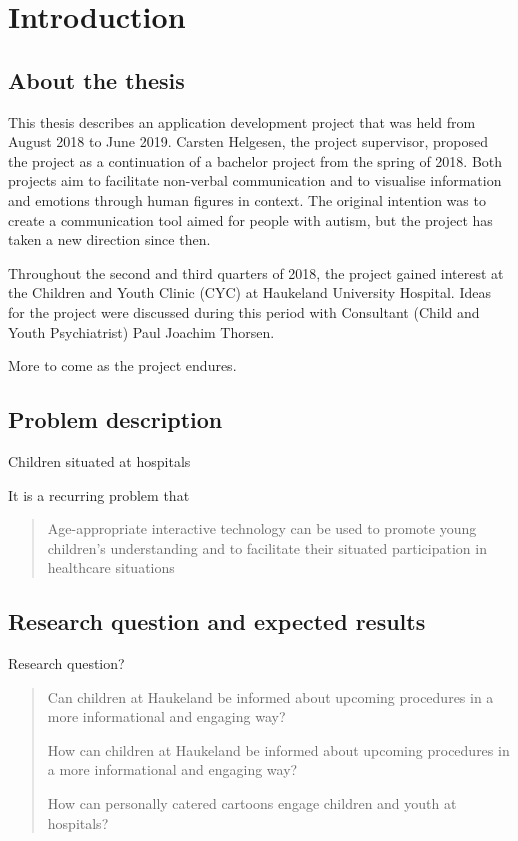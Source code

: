 \chapter{Introduction}
\label{ch:introduction}

\section{About the thesis}

This thesis describes an application development project that was held from August 2018 to June 2019. Carsten Helgesen, the project supervisor, proposed the project as a continuation of a bachelor project from the spring of 2018. Both projects aim to facilitate non-verbal communication and to visualise information and emotions through human figures in context. The original intention was to create a communication tool aimed for people with autism, but the project has taken a new direction since then.

Throughout the second and third quarters of 2018, the project gained interest at the Children and Youth Clinic (CYC) at Haukeland University Hospital. Ideas for the project were discussed during this period with Consultant (Child and Youth Psychiatrist) Paul Joachim Thorsen.

More to come as the project endures.

\section{Problem description}

Children situated at hospitals

It is a recurring problem that 

\begin{quote}
    Age-appropriate interactive technology can be used to promote young children’s understanding and to facilitate their situated participation in healthcare situations \cite{stalberg2018}
\end{quote}

\section{Research question and expected results}

Research question?

\begin{quote}
    Can children at Haukeland be informed about upcoming procedures in a more informational and engaging way?
    
    How can children at Haukeland be informed about upcoming procedures in a more informational and engaging way?
    
    How can personally catered cartoons engage children and youth at hospitals?
\end{quote}

